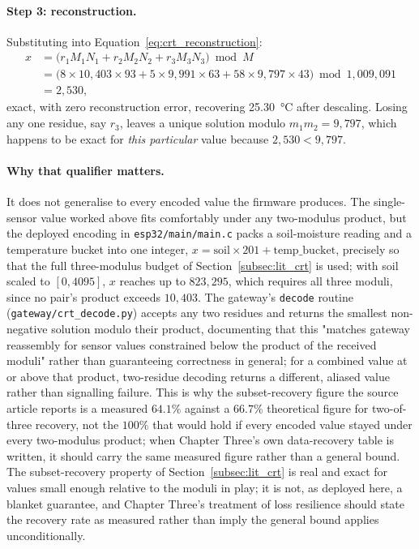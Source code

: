 \documentclass[12pt,a4paper,oneside]{book}
\begin{document}
\paragraph{Step 3: reconstruction.} Substituting into
Equation~\ref{eq:crt_reconstruction}:
\begin{align*}
x &= \bigl( r_1 M_1 N_1 + r_2 M_2 N_2 + r_3 M_3 N_3 \bigr) \bmod M \\
  &= \bigl( 8 \times 10{,}403 \times 93 + 5 \times 9{,}991 \times 63
           + 58 \times 9{,}797 \times 43 \bigr) \bmod 1{,}009{,}091 \\
  &= 2{,}530,
\end{align*}
exact, with zero reconstruction error, recovering \SI{25.30}{\celsius}
after descaling. Losing any one residue, say $r_3$, leaves a unique
solution modulo $m_1 m_2 = 9{,}797$, which happens to be exact for
\emph{this particular} value because $2{,}530 < 9{,}797$.

\paragraph{Why that qualifier matters.} It does not generalise to every
encoded value the firmware produces. The single-sensor value worked above
fits comfortably under any two-modulus product, but the deployed encoding
in \texttt{esp32/main/main.c} packs a soil-moisture reading and a
temperature bucket into one integer, $x = \mathrm{soil}\times 201 +
\mathrm{temp\_bucket}$, precisely so that the full three-modulus budget of
Section~\ref{subsec:lit_crt} is used; with soil scaled to
$[0,4095]$, $x$ reaches up to $823{,}295$, which requires all three
moduli, since no pair's product exceeds $10{,}403$. The gateway's
\texttt{decode} routine (\texttt{gateway/crt\_decode.py}) accepts any two
residues and returns the smallest non-negative solution modulo their
product, documenting that this "matches gateway reassembly for sensor
values constrained below the product of the received moduli" rather than
guaranteeing correctness in general; for a combined value at or above
that product, two-residue decoding returns a different, aliased value
rather than signalling failure. This is why the subset-recovery figure
the source article reports is a measured $64.1\%$ against a $66.7\%$
theoretical figure for two-of-three recovery, not the $100\%$ that would
hold if every encoded value stayed under every two-modulus product; when
Chapter Three's own data-recovery table is written, it should carry the
same measured figure rather than a general bound. The
subset-recovery property of Section~\ref{subsec:lit_crt} is real and
exact for values small enough relative to the moduli in play; it is not,
as deployed here, a blanket guarantee, and Chapter Three's treatment of
loss resilience should state the recovery rate as measured rather than
imply the general bound applies unconditionally.
\end{document}
